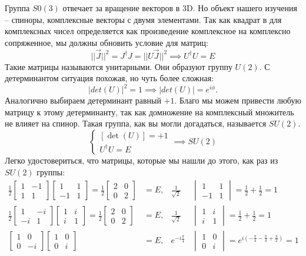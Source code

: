 Группа $S0(3)$ отвечает за вращение векторов в 3D. Но объект нашего изучения -- спиноры, комплексные векторы с двумя элементами. Так как квадрат в для комплексных чисел определяется как произведение комплексное на комплексно сопряженное, мы должны обновить условие для матриц:
\[
||\Vec{J}||^2 = J^{\dagger}J = ||U\Vec{J}||^2 \implies  U^{\dagger}U = E
\]
Такие матрицы называются унитарными. Они образуют группу $U(2)$. С детерминантом ситуация похожая, но чуть более сложная:
\[
|det(U)|^2 = 1 \implies |det(U)| = e^{i\phi}.
\]
Аналогично выбираем детерминант равный $+1$. Благо мы можем привести любую матрицу к этому детерминанту, так как домножение на комплексный множитель не влияет на спинор. Такая группа, как вы могли догадаться, называется $SU(2)$.
\[
\begin{cases}
    [\det(U)] = +1\\
     U^{\dagger}U = E
\end{cases} \implies SU(2)
\]
Легко удостовериться, что матрицы, которые мы нашли до этого, как раз из $SU(2)$ группы:
\begin{align*}
    \frac{1}{2}\begin{bmatrix} 1 & -1 \\ 1 & 1 \end{bmatrix} \begin{bmatrix} 1 & 1 \\ -1 & 1 \end{bmatrix} = \frac{1}{2} \begin{bmatrix} 2 & 0 \\ 0 & 2 \end{bmatrix} &= E, & \frac{1}{\sqrt{2}}&\begin{vmatrix} 1 & 1\\ -1 & 1\end{vmatrix} = \frac{1}{2} + \frac{1}{2} = 1\\
    \frac{1}{2}\begin{bmatrix} 1 & -i \\ -i & 1 \end{bmatrix}\begin{bmatrix} 1 & i \\ i & 1 \end{bmatrix} = \frac{1}{2}\begin{bmatrix} 2 & 0 \\ 0 & 2 \end{bmatrix} &= E, & \frac{1}{\sqrt{2}}&\begin{vmatrix} 1 & i \\ i & 1 \end{vmatrix} = \frac{1}{2} + \frac{1}{2} = 1\\
    \begin{bmatrix} 1 & 0 \\ 0 & -i \end{bmatrix}\begin{bmatrix} 1 & 0 \\ 0 & i \end{bmatrix} &= E, & e^{-i\frac{\pi}{4}} &\begin{vmatrix} 1 & 0 \\ 0 & i \end{vmatrix} = e^{i(-\frac{\pi}{4} - \frac{\pi}{4} + \frac{\pi}{2})} = 1\\
\end{align*}
